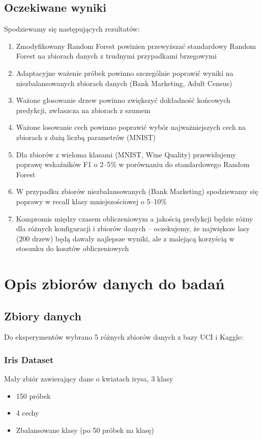 \documentclass[12pt,a4paper]{article}
\begin{document}
\subsection{Oczekiwane wyniki}
\begin{sloppypar}
Spodziewamy się następujących rezultatów:
\begin{enumerate}
    \item Zmodyfikowany Random Forest powinien przewyższać standardowy Random Forest na zbiorach danych z trudnymi przypadkami brzegowymi
    \item Adaptacyjne ważenie próbek powinno szczególnie poprawić wyniki na niezbalansowanych zbiorach danych (Bank Marketing, Adult Census)
    \item Ważone głosowanie drzew powinno zwiększyć dokładność końcowych predykcji, zwłaszcza na zbiorach z szumem
    \item Ważone losowanie cech powinno poprawić wybór najważniejszych cech na zbiorach z dużą liczbą parametrów (MNIST)
    \item Dla zbiorów z wieloma klasami (MNIST, Wine Quality) przewidujemy poprawę wskaźników F1 o 2--5\% w porównaniu do standardowego Random Forest
    \item W przypadku zbiorów niezbalansowanych (Bank Marketing) spodziewamy się poprawy w recall klasy mniejszościowej o 5--10\%
    \item Kompromis między czasem obliczeniowym a jakością predykcji będzie różny dla różnych konfiguracji i zbiorów danych -- oczekujemy, że największe lasy (200 drzew) będą dawały najlepsze wyniki, ale z malejącą korzyścią w stosunku do kosztów obliczeniowych
\end{enumerate}
\end{sloppypar}

\section{Opis zbiorów danych do badań}

\subsection{Zbiory danych}

Do eksperymentów wybrano 5 różnych zbiorów danych z bazy UCI i Kaggle:

\subsubsection{Iris Dataset}
Mały zbiór zawierający dane o kwiatach irysa, 3 klasy
\begin{itemize}
    \item 150 próbek
    \item 4 cechy
    \item Zbalansowane klasy (po 50 próbek na klasę)
\end{itemize}
\end{document}
